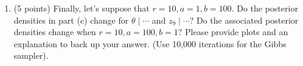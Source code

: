 \documentclass{article}
\begin{document}
\begin{enumerate}
\begin{enumerate}
\item (5 points) Finally, let's suppose that $r=10,a=1,b=100.$ Do the posterior densities in part (c) change for $\theta \mid \cdots$ and $z_9 \mid \cdots?$
 Do the associated posterior densities change when $r=10, a=100,b=1?$ Please provide plots and an explanation to back up your answer.  (Use 10,000 iterations for the Gibbs sampler). 
\end{enumerate}





\end{enumerate}
\end{document}
